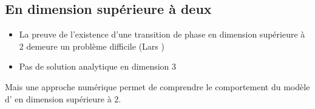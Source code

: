 \documentclass[french]{beamer}
\begin{document}

%
\subsection{En dimension supérieure à deux}
%

\begin{frame}
    \begin{itemize}
        \item La preuve de l'existence d'une transition de phase en dimension supérieure à $2$ demeure un problème difficile (Lars )
        \item Pas de solution analytique en dimension $3$
    \end{itemize}
    Mais une approche numérique permet de comprendre le comportement du modèle d' en dimension supérieure à $2$.
\end{frame}
\end{document}
